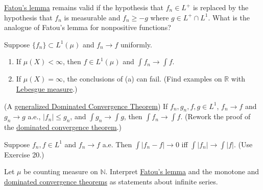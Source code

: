 	\begin{exercise}[Folland 2.18]
		\hyperref[thm:fatous-lemma]{Fatou's lemma} remains valid if the hypothesis that $f_n \in L^+$ is replaced by the hypothesis that $f_n$ is measurable and $f_n \ge -g$ where $g \in L^+ \cap L^1$. What is the analogue of Fatou's lemma for nonpositive functions?
	\end{exercise}
	\begin{solution}

	\end{solution}

	\begin{exercise}[Folland 2.19]
		Suppose $\{f_n\} \subset L^1(\mu)$ and $f_n \to f$ uniformly.
		\begin{enumerate}[label=\textbf{\alph*.}]
			\item If $\mu(X) < \infty$, then $f \in L^1(\mu)$ and $\int f_n \to \int f$.
			\item If $\mu(X) = \infty$, the conclusions of (a) can fail. (Find examples on $\mathbb{R}$ with \hyperref[def:lebesgue-measure]{Lebesgue measure}.)
		\end{enumerate}
	\end{exercise}
	\begin{solution}

	\end{solution}

	\begin{exercise}[Folland 2.20]
		(A \hyperref[thm:generalized-dominated-convergence-theorem]{generalized Dominated Convergence Theorem}) If $f_n, g_n, f, g \in L^1$, $f_n \to f$ and $g_n \to g$ a.e., $|f_n| \le g_n$, and $\int g_n \to \int g$, then $\int f_n \to \int f$. (Rework the proof of the \hyperref[thm:dominated-convergence-theorem]{dominated convergence theorem}.)
	\end{exercise}
	\begin{solution}

	\end{solution}

	\begin{exercise}[Folland 2.21]
		Suppose $f_n, f \in L^1$ and $f_n \to f$ a.e. Then $\int |f_n - f| \to 0$ iff $\int |f_n| \to \int |f|$. (Use Exercise 20.)
	\end{exercise}
	\begin{solution}

	\end{solution}

	\begin{exercise}[Folland 2.22]
		Let $\mu$ be counting measure on $\mathbb{N}$. Interpret \hyperref[thm:fatous-lemma]{Fatou's lemma} and the monotone and \hyperref[thm:dominated-convergence-theorem]{dominated convergence theorems} as statements about infinite series.
	\end{exercise}
	\begin{solution}

	\end{solution}

